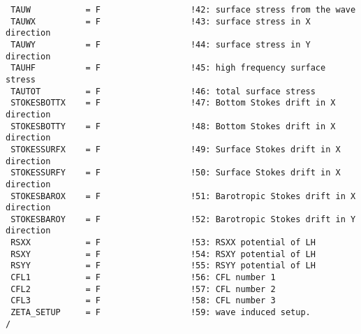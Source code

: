 \documentclass[12pt]{amsart}
\begin{document}
\begin{verbatim}
 TAUW           = F                  !42: surface stress from the wave
 TAUWX          = F                  !43: surface stress in X direction
 TAUWY          = F                  !44: surface stress in Y direction
 TAUHF          = F                  !45: high frequency surface stress
 TAUTOT         = F                  !46: total surface stress
 STOKESBOTTX    = F                  !47: Bottom Stokes drift in X direction
 STOKESBOTTY    = F                  !48: Bottom Stokes drift in X direction
 STOKESSURFX    = F                  !49: Surface Stokes drift in X direction
 STOKESSURFY    = F                  !50: Surface Stokes drift in X direction
 STOKESBAROX    = F                  !51: Barotropic Stokes drift in X direction
 STOKESBAROY    = F                  !52: Barotropic Stokes drift in Y direction
 RSXX           = F                  !53: RSXX potential of LH
 RSXY           = F                  !54: RSXY potential of LH
 RSYY           = F                  !55: RSYY potential of LH
 CFL1           = F                  !56: CFL number 1
 CFL2           = F                  !57: CFL number 2
 CFL3           = F                  !58: CFL number 3
 ZETA_SETUP     = F                  !59: wave induced setup.
/
\end{verbatim}
\end{document}
